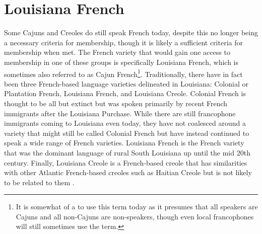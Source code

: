 
  \section{Louisiana French}
    Some Cajuns and Creoles do still speak French today, despite this no longer being a necessary criteria for membership, though it is likely a sufficient criteria for membership when met.
    The French variety that would gain one access to membership in one of these groups is specifically Louisiana French, which is sometimes also referred to as Cajun French\footnote{
      It is somewhat of a  to use this term today as it presumes that all speakers are Cajuns and all non-Cajuns are non-speakers, though even local francophones will still sometimes use the term.
    }.
    Traditionally, there have in fact been three French-based language varieties delineated in Louisiana: Colonial or Plantation French, Louisiana French, and Louisiana Creole.
    Colonial French is thought to be all but extinct but was spoken primarily by recent French immigrants after the Louisiana Purchase.
    While there are still francophone immigrants coming to Louisiana even today, they have not coalesced around a variety that might still be called Colonial French but have instead continued to speak a wide range of French varieties.
    Louisiana French is the French variety that was the dominant language of rural South Louisiana up until the mid 20th century.
    Finally, Louisiana Creole is a French-based creole that has similarities with other Atlantic French-based creoles such as Haitian Creole but is not likely to be related to them \parencite[pp.~280-281]{dajko_sociolinguistics_2012}.


